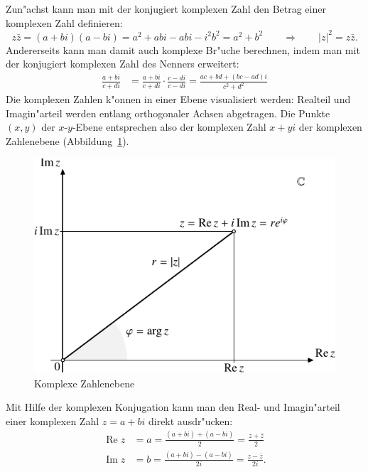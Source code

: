 Zun"achst kann man mit der konjugiert komplexen Zahl den Betrag einer
komplexen Zahl definieren:
\[
z\bar z=(a+bi)(a-bi)=a^2+abi-abi-i^2b^2=a^2+b^2\qquad\Rightarrow\qquad
|z|^2=z\bar z.
\]
Andererseits kann man damit auch komplexe Br"uche berechnen, indem man
mit der konjugiert komplexen Zahl des Nenners erweitert:
\begin{align*}
\frac{a+bi}{c+di}&=
\frac{a+bi}{c+di}
\cdot
\frac{c-di}{c-di}=\frac{ac+bd+(bc-ad)i}{c^2+d^2}
\end{align*}
Die komplexen Zahlen k"onnen in einer Ebene visualisiert werden: 
Realteil und Imagin"arteil werden entlang orthogonaler Achsen abgetragen.
Die Punkte $(x,y)$ der $x$-$y$-Ebene entsprechen also der komplexen Zahl
$x+yi$ der komplexen Zahlenebene (Abbildung~\ref{skript:gaussebene}).
\begin{figure}
\centering
\includegraphics{chapters/images/komplexezahlen-1.pdf}
\caption{Komplexe Zahlenebene
\label{skript:gaussebene}}
\end{figure}
%
%

Mit Hilfe der komplexen Konjugation kann man den Real- und Imagin"arteil
einer komplexen Zahl $z=a+bi$ direkt ausdr"ucken:
\begin{align}
\operatorname{Re}z 
&=
a=\frac{(a+bi)+(a-bi)}2=\frac{z+\bar z}2
\label{skript:realteil-formel}
\\
\operatorname{Im}z
&=
b=\frac{(a+bi)-(a-bi)}{2i}=\frac{z-\bar z}{2i}.
\label{skript:imaginaerteil-formel}
\end{align}

